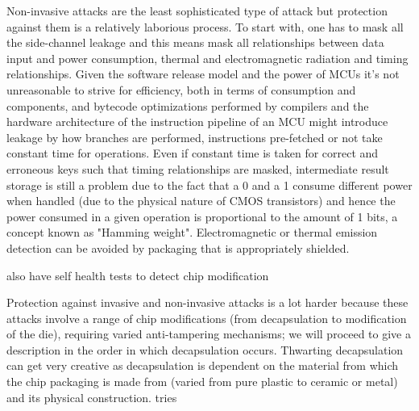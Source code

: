 Non-invasive attacks are the least sophisticated type of attack but protection against them is a relatively laborious process\citep{anderson:cautionary_note}. To start with, one has to mask all the side-channel leakage and this means mask all relationships between data input and power consumption, thermal and electromagnetic radiation and timing relationships\citep{kocher:DPA}\cite{sergei:thesis}. Given the software release model and the power of MCUs it's not unreasonable to strive for efficiency, both in terms of consumption and components, and bytecode optimizations performed by compilers and the hardware architecture of the instruction pipeline of an MCU might introduce leakage \citep{kocher:DPA}\citep{sergei:thesis} by how branches are performed, instructions pre-fetched or not take constant time for operations. Even if constant time is taken for correct and erroneous keys such that timing relationships are masked, intermediate result storage is still a problem due to the fact that a 0 and a 1 consume different power when handled (due to the physical nature of CMOS transistors) and hence the power consumed in a given operation is proportional to the amount of 1 bits, a concept known as "Hamming weight"\citep{website:riscure}\citep{kocher:DPA}. Electromagnetic or thermal emission detection can be avoided by packaging that is appropriately shielded\citep{website:ibm_secure}\citep{kocher:DPA}. 


also have self health tests to detect chip modification \citep{anderson:tamper_resistance}

Protection against invasive and non-invasive attacks is a lot harder because these attacks involve a range of chip modifications (from decapsulation to modification of the die), requiring varied anti-tampering mechanisms; we will proceed to give a description in the order in which decapsulation occurs. Thwarting decapsulation can get very creative as decapsulation is dependent on the material from which the chip packaging is made from (varied from pure plastic to ceramic or metal) and its physical construction. tries 

